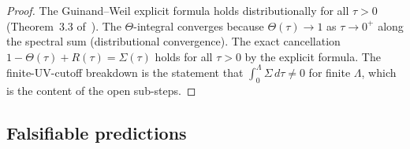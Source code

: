 \begin{proof}
The Guinand--Weil explicit formula holds distributionally for all
$\tau > 0$ (Theorem~3.3 of~\cite{brendecke2026rh}). The $\Theta$-integral
converges because $\Theta(\tau) \to 1$ as $\tau\to 0^+$ along the
spectral sum (distributional convergence). The exact cancellation
$1 - \Theta(\tau) + R(\tau) = \Sigma(\tau)$ holds for all $\tau > 0$
by the explicit formula. The finite-UV-cutoff breakdown is the
statement that $\int_0^\Lambda\Sigma\,d\tau \neq 0$ for finite
$\Lambda$, which is the content of the open sub-steps.
\end{proof}

\subsection{Falsifiable predictions}
\label{sec:falsifiable}


